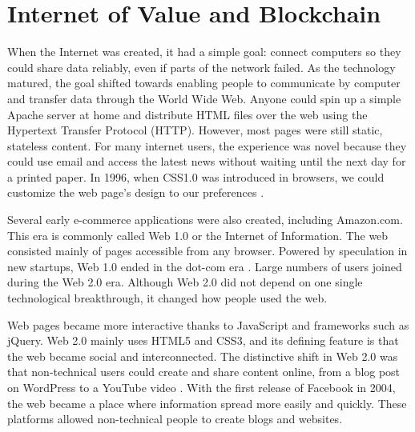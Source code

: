 \section{Internet of Value and Blockchain}
\label{sec:analysis}

When the Internet was created, it had a simple goal: connect computers so they could share data reliably, even if parts of the network failed.
As the technology matured, the goal shifted towards enabling people to communicate by computer and transfer data through the World Wide Web.
Anyone could spin up a simple Apache server at home and distribute HTML files over the web using the Hypertext Transfer Protocol (HTTP).
However, most pages were still static, stateless content. For many internet users, the experience was novel because they could use email and access the latest news without waiting until the next day for a printed paper.
In 1996, when CSS1.0 was introduced in browsers, we could customize the web page's design to our preferences \cite{Choudhury2014}.

Several early e-commerce applications were also created, including Amazon.com.
This era is commonly called Web 1.0 or the Internet of Information. The web consisted mainly of pages accessible from any browser.
Powered by speculation in new startups, Web 1.0 ended in the dot-com era \cite{Goodnight2010}.
Large numbers of users joined during the Web 2.0 era. Although Web 2.0 did not depend on one single technological breakthrough, it changed how people used the web.

Web pages became more interactive thanks to JavaScript and frameworks such as jQuery. Web 2.0 mainly uses HTML5 and CSS3, and its defining feature is that the web became social and interconnected.
The distinctive shift in Web 2.0 was that non-technical users could create and share content online, from a blog post on WordPress to a YouTube video \cite{Web1, Krumm2008, Chakravorty2017}.
With the first release of Facebook in 2004, the web became a place where information spread more easily and quickly.
These platforms allowed non-technical people to create blogs and websites.

